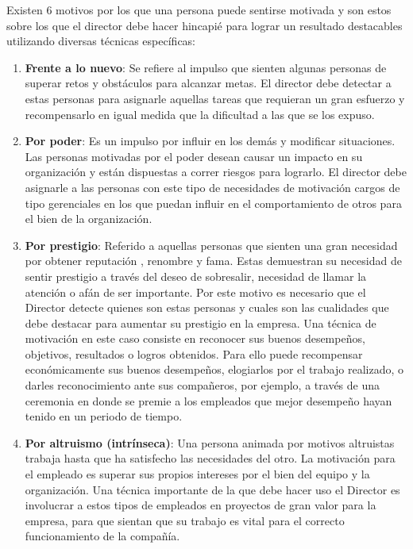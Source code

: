Existen 6 motivos por los que una persona  puede sentirse motivada y son estos sobre los que el director debe hacer hincapié para lograr un resultado destacables utilizando diversas técnicas específicas:
\begin{enumerate}
\item \textbf{Frente a lo nuevo}: Se refiere al impulso que sienten algunas personas de superar retos y obstáculos para alcanzar metas. El director debe detectar a estas personas para asignarle aquellas tareas que requieran un gran esfuerzo y recompensarlo en igual medida que la dificultad a las que se los expuso.

\item \textbf{Por poder}: Es un impulso por influir en los demás y modificar situaciones. Las personas motivadas por el poder desean causar un impacto en su organización y están dispuestas a correr riesgos para lograrlo. El director debe asignarle a las personas con este tipo de necesidades de motivación cargos de tipo gerenciales en los que puedan influir en el comportamiento de otros para el bien de la organización.

\item \textbf{Por prestigio}: Referido a aquellas personas que sienten una gran necesidad por obtener reputación , renombre y fama.  Estas demuestran su necesidad de sentir prestigio a través del deseo de sobresalir, necesidad de llamar la atención o afán de ser importante.
Por este motivo es necesario que el Director detecte quienes son estas personas y cuales son las cualidades que debe destacar para aumentar su prestigio en la empresa.  
Una técnica de motivación en este caso consiste en reconocer sus buenos desempeños, objetivos, resultados o logros obtenidos. Para ello puede recompensar económicamente sus buenos desempeños, elogiarlos por el trabajo realizado, o darles reconocimiento ante sus compañeros, por ejemplo, a través de una ceremonia en donde se premie a los empleados que mejor desempeño hayan tenido en un periodo de tiempo.

\item \textbf{Por altruismo (intrínseca)}: Una persona animada por motivos altruistas trabaja hasta que ha satisfecho las necesidades del otro.
La motivación para el empleado es superar sus propios intereses por el bien del equipo y la organización.
Una técnica importante de la que debe hacer uso el Director es involucrar a estos tipos de empleados en proyectos de gran valor para la empresa, para que sientan que su trabajo es vital para el correcto funcionamiento de la compañía.


\end{enumerate}
